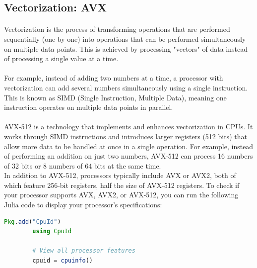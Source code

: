 \subsection{Vectorization: AVX}

    \paragraph*{}
    Vectorization is the process of transforming operations that are performed sequentially (one by one) into operations that can be 
    performed simultaneously on multiple data points. This is achieved by processing "vectors" of data instead of processing a single 
    value at a time.
    \par

    \paragraph*{}
    For example, instead of adding two numbers at a time, a processor with vectorization can add several numbers simultaneously using 
    a single instruction. This is known as SIMD (Single Instruction, Multiple Data), meaning one instruction operates on multiple data 
    points in parallel.
    \par

    \paragraph*{}
    AVX-512 is a technology that implements and enhances vectorization in CPUs. It works through SIMD instructions and introduces larger registers 
    (512 bits) that allow more data to be handled at once in a single operation. For example, instead of performing an addition 
    on just two numbers, AVX-512 can process 16 numbers of 32 bits or 8 numbers of 64 bits at the same time.
    \\
    In addition to AVX-512, processors typically include AVX or AVX2, both of which feature 256-bit registers, half the size of 
    AVX-512 registers. To check if your processor supports AVX, AVX2, or AVX-512, you can run the following Julia code to display 
    your processor’s specifications:
    \\
    \begin{lstlisting}[language=Julia]
        Pkg.add("CpuId")
        using CpuId

        # View all processor features
        cpuid = cpuinfo()
    \end{lstlisting}
    \vspace{0.5cm}
    
